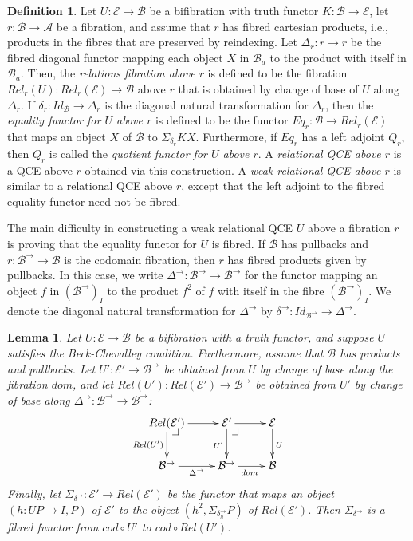 \documentclass{LMCS}
\makeatletter
\newcommand{\ra}{\rightarrow}
\newcommand\lpbc[1][dr]{\save*!/#1-1.2pc/#1:(-1,1)@^{|-}\restore}
\newcommand\E{{\mathcal E}}
\newcommand\B{{\mathcal B}}
\newcommand\A{{\mathcal A}}
\theoremstyle{plain}
\newtheorem{lemma}[theorem]{Lemma}
\theoremstyle{remark}
\theoremstyle{definition}
\newtheorem{definition}[theorem]{Definition}
\makeatother
\begin{document}
\begin{definition}\label{def:relqceabover}
  Let $U:\E\to\B$ be a bifibration with truth functor $K:\B\to\E$, let
  $r:\B\to\A$ be a fibration, and assume that $r$ has fibred cartesian
  products, i.e., products in the fibres that are preserved by
  reindexing. Let $\Delta_r:r\to r$ be the fibred diagonal functor
  mapping each object $X$ in $\B_a$ to the product with itself in
  $\B_a$.  Then, the {\em relations fibration above $r$} is defined to
  be the fibration $Rel_r(U):Rel_r(\E)\to \B$ above $r$ that is
  obtained by change of base of $U$ along $\Delta_r$. If
  $\delta_r:Id_\B\to \Delta_r$ is the diagonal natural transformation
  for $\Delta_r$, then the {\em equality functor for $U$ above $r$} is
  defined to be the functor $Eq_r:\B\to Rel_r(\E)$ that maps an object
  $X$ of $\B$ to $\Sigma_{\delta_r}K X$.  Furthermore, if $Eq_r$ has a
  left adjoint $Q_r$, then $Q_r$ is called the {\em quotient functor
    for $U$ above $r$}.  A {\em relational QCE above $r$} is a QCE
  above $r$ obtained via this construction. A {\em weak relational QCE
    above $r$} is similar to a relational QCE above $r$, except that
  the left adjoint to the fibred equality functor need not be fibred.
\end{definition}

The main difficulty in constructing a weak relational QCE $U$ above a
fibration $r$ is proving that the equality functor for $U$ is
fibred. If $\B$ has pullbacks and $r : \B^\to \to \B$ is the codomain
fibration, then $r$ has fibred products given by pullbacks.  In this
case, we write $\Delta^\ra:\B^\ra \ra \B^\ra$ for the functor mapping
an object $f$ in $(\B^\ra)_I$ to the product $f^2$ of $f$ with itself
in the fibre $(\B^\ra)_I$. We denote the diagonal natural
transformation for $\Delta^\to$ by $\delta^\ra:Id_{\B^\ra} \ra
\Delta^\ra$.


\begin{lemma}\label{lem:carts}
Let $U:\E \ra \B$ be a bifibration with a truth functor, and suppose
$U$ satisfies the Beck-Chevalley condition. Furthermore, assume that
$\B$ has products and pullbacks. Let $U':\E' \ra \B^\ra$ be obtained
from $U$ by change of base along the fibration $\mathit{dom}$, and let
$Rel(U'):Rel(\E') \ra \B^\ra$ be obtained from $U'$ by change of base
along $\Delta^\ra : \B^\to \to \B^\to$:
\[\xymatrix{ Rel(\E') \ar[d]_{Rel(U')} \ar[r] \lpbc &\ar[d]_{U'} \E' \ar[r] \lpbc
    & \E \ar[d]^U\\ \B^\to \ar[r]_{\Delta^\to} & \B^\to \ar[r]_{dom} &
  \B\\ }\] 
Finally, let $\Sigma_{\delta^\ra}:\E' \ra Rel(\E')$ be the functor
that maps an object $(h:UP \ra I, P)$ of $\E'$ to the object
$(h^2,\Sigma_{\delta^\ra_h} P)$ of $Rel(\E')$. Then
$\Sigma_{\delta^\ra}$ is a fibred functor from $cod\circ U'$ to
$cod\circ Rel(U')$.
\end{lemma}
\end{document}
